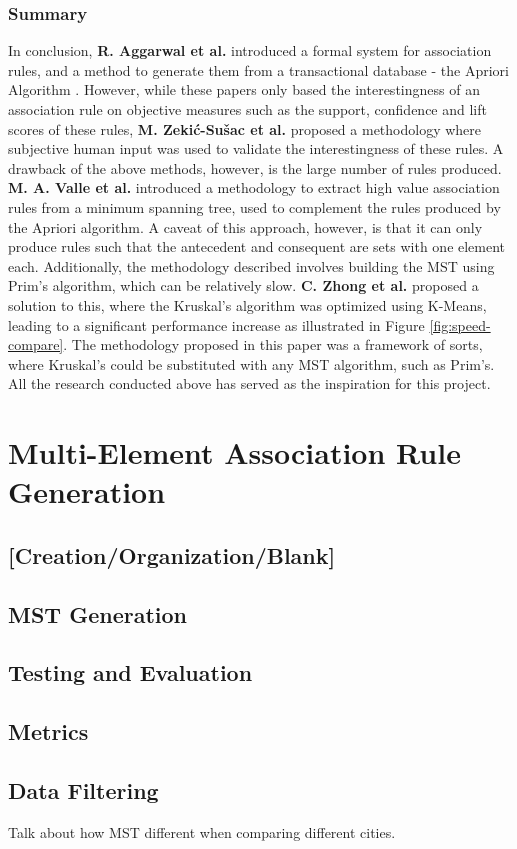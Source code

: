 \documentclass[paper=a4,fontsize=11pt]{report}	%
\begin{document}
\subsection{Summary}
In conclusion, \textbf{R. Aggarwal et al.} introduced a formal system for association rules, and a method to generate them from a transactional database - the Apriori Algorithm \cite{apriori}.  However, while these papers only based the interestingness of an association rule on objective measures such as the support, confidence and lift scores of these rules, \textbf{M. Zekić-Sušac et al.} proposed a methodology where subjective human input was used to validate the interestingness of these rules. A drawback of the above methods, however, is the large number of rules produced. \textbf{M. A. Valle et al.} introduced a methodology to extract high value association rules from a minimum spanning tree, used to complement the rules produced by the Apriori algorithm. A caveat of this approach, however, is that it can only produce rules such that the antecedent and consequent are sets with one element each. Additionally, the methodology described involves building the MST using Prim's algorithm, which can be relatively slow. \textbf{C. Zhong et al.} proposed a solution to this, where the Kruskal's algorithm was optimized using K-Means, leading to a significant performance increase as illustrated in Figure \ref{fig:speed-compare}. The methodology proposed in this paper was a framework of sorts, where Kruskal's could be substituted with any MST algorithm, such as Prim's.
All the research conducted above has served as the inspiration for this project.


\chapter{Multi-Element Association Rule Generation}
\section{[Creation/Organization/Blank]}

\section{MST Generation}

\section{Testing and Evaluation}
\section{Metrics}
\section{Data Filtering}
Talk about how MST different when comparing different cities.

\printbibliography[heading=bibintoc, title=References]

\end{document}
